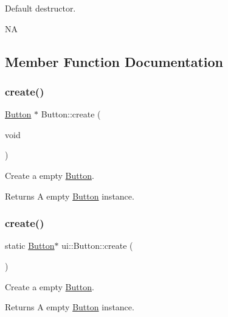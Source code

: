 Default destructor.

NA 

\subsection{Member Function Documentation}
\mbox{\label{classui_1_1Button_a109e34aba9c15cbbc790bdcb0b67de29}} 
\subsubsection{\texorpdfstring{create()}{create()}\hspace{0.1cm}{\footnotesize\ttfamily [1/4]}}
{\footnotesize\ttfamily \hyperlink{classui_1_1Button}{Button} $\ast$ Button\+::create (\begin{DoxyParamCaption}\item[{void}]{ }\end{DoxyParamCaption})\hspace{0.3cm}{\ttfamily [static]}}

Create a empty \hyperlink{classui_1_1Button}{Button}. \begin{DoxyReturn}{Returns}
A empty \hyperlink{classui_1_1Button}{Button} instance. 
\end{DoxyReturn}
\mbox{\label{classui_1_1Button_a99f75cd3aa21108bf21d4574a804daff}} 
\subsubsection{\texorpdfstring{create()}{create()}\hspace{0.1cm}{\footnotesize\ttfamily [2/4]}}
{\footnotesize\ttfamily static \hyperlink{classui_1_1Button}{Button}$\ast$ ui\+::\+Button\+::create (\begin{DoxyParamCaption}{ }\end{DoxyParamCaption})\hspace{0.3cm}{\ttfamily [static]}}

Create a empty \hyperlink{classui_1_1Button}{Button}. \begin{DoxyReturn}{Returns}
A empty \hyperlink{classui_1_1Button}{Button} instance. 
\end{DoxyReturn}
\mbox{\label{classui_1_1Button_a0008ef9c3fd2bd012803a4d99422b533}} 
